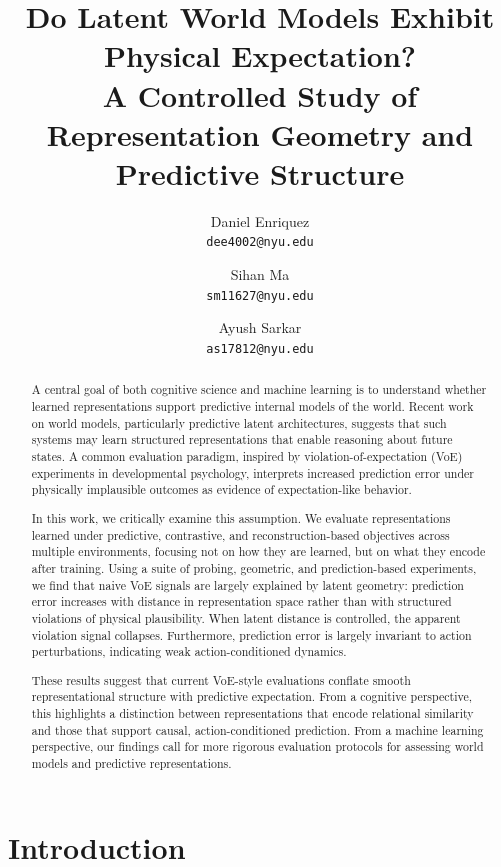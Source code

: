 \documentclass[10pt,twocolumn]{article}
\title{
Do Latent World Models Exhibit Physical Expectation?\\
\large A Controlled Study of Representation Geometry and Predictive Structure
}
\author{
Daniel Enriquez \\
\texttt{dee4002@nyu.edu}
\and
Sihan Ma \\
\texttt{sm11627@nyu.edu}
\and
Ayush Sarkar \\
\texttt{as17812@nyu.edu}
}
\date{}
\begin{document}
\maketitle

\begin{abstract}
A central goal of both cognitive science and machine learning is to understand whether learned representations support predictive internal models of the world. Recent work on world models, particularly predictive latent architectures, suggests that such systems may learn structured representations that enable reasoning about future states. A common evaluation paradigm, inspired by violation-of-expectation (VoE) experiments in developmental psychology, interprets increased prediction error under physically implausible outcomes as evidence of expectation-like behavior.

In this work, we critically examine this assumption. We evaluate representations learned under predictive, contrastive, and reconstruction-based objectives across multiple environments, focusing not on how they are learned, but on what they encode after training. Using a suite of probing, geometric, and prediction-based experiments, we find that naive VoE signals are largely explained by latent geometry: prediction error increases with distance in representation space rather than with structured violations of physical plausibility. When latent distance is controlled, the apparent violation signal collapses. Furthermore, prediction error is largely invariant to action perturbations, indicating weak action-conditioned dynamics.

These results suggest that current VoE-style evaluations conflate smooth representational structure with predictive expectation. From a cognitive perspective, this highlights a distinction between representations that encode relational similarity and those that support causal, action-conditioned prediction. From a machine learning perspective, our findings call for more rigorous evaluation protocols for assessing world models and predictive representations.
\end{abstract}

\section{Introduction}
\end{document}
